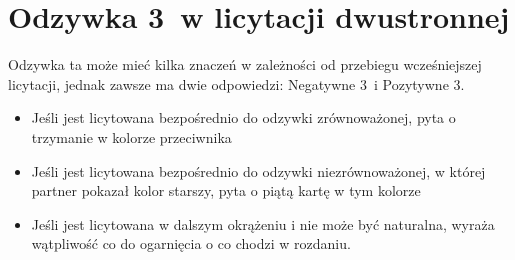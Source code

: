 \documentclass[12pt, a4paper]{article}
\begin{document}
\section{Odzywka 3\diams\ w licytacji dwustronnej}
Odzywka ta może mieć kilka znaczeń w zależności od przebiegu wcześniejszej licytacji,
jednak zawsze ma dwie odpowiedzi: Negatywne 3\hearts\ i Pozytywne 3\spades.
\begin{itemize}
    \item Jeśli jest licytowana bezpośrednio do odzywki zrównoważonej, pyta o trzymanie w kolorze przeciwnika
    \item Jeśli jest licytowana bezpośrednio do odzywki niezrównoważonej, w której partner pokazał kolor starszy,
    pyta o piątą kartę w tym kolorze
    \item Jeśli jest licytowana w dalszym okrążeniu i nie może być naturalna, wyraża wątpliwość co do
    ogarnięcia o co chodzi w rozdaniu.
\end{itemize}
\end{document}

